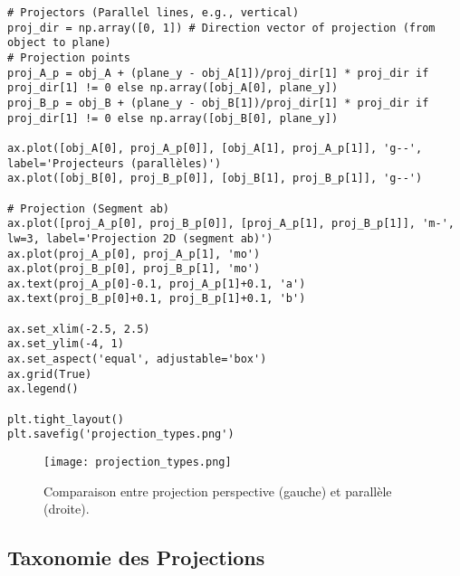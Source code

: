 \documentclass{article}
\begin{document}
\begin{verbatim}
# Projectors (Parallel lines, e.g., vertical)
proj_dir = np.array([0, 1]) # Direction vector of projection (from object to plane)
# Projection points
proj_A_p = obj_A + (plane_y - obj_A[1])/proj_dir[1] * proj_dir if proj_dir[1] != 0 else np.array([obj_A[0], plane_y])
proj_B_p = obj_B + (plane_y - obj_B[1])/proj_dir[1] * proj_dir if proj_dir[1] != 0 else np.array([obj_B[0], plane_y])

ax.plot([obj_A[0], proj_A_p[0]], [obj_A[1], proj_A_p[1]], 'g--', label='Projecteurs (parallèles)')
ax.plot([obj_B[0], proj_B_p[0]], [obj_B[1], proj_B_p[1]], 'g--')

# Projection (Segment ab)
ax.plot([proj_A_p[0], proj_B_p[0]], [proj_A_p[1], proj_B_p[1]], 'm-', lw=3, label='Projection 2D (segment ab)')
ax.plot(proj_A_p[0], proj_A_p[1], 'mo')
ax.plot(proj_B_p[0], proj_B_p[1], 'mo')
ax.text(proj_A_p[0]-0.1, proj_A_p[1]+0.1, 'a')
ax.text(proj_B_p[0]+0.1, proj_B_p[1]+0.1, 'b')

ax.set_xlim(-2.5, 2.5)
ax.set_ylim(-4, 1)
ax.set_aspect('equal', adjustable='box')
ax.grid(True)
ax.legend()

plt.tight_layout()
plt.savefig('projection_types.png')
\end{verbatim}

\begin{figure}[H]
\centering
\texttt{[image: projection\_types.png]}
\caption{Comparaison entre projection perspective (gauche) et parallèle (droite).}
\label{fig:projection_types}
\end{figure}

\subsection{Taxonomie des Projections}
\end{document}
